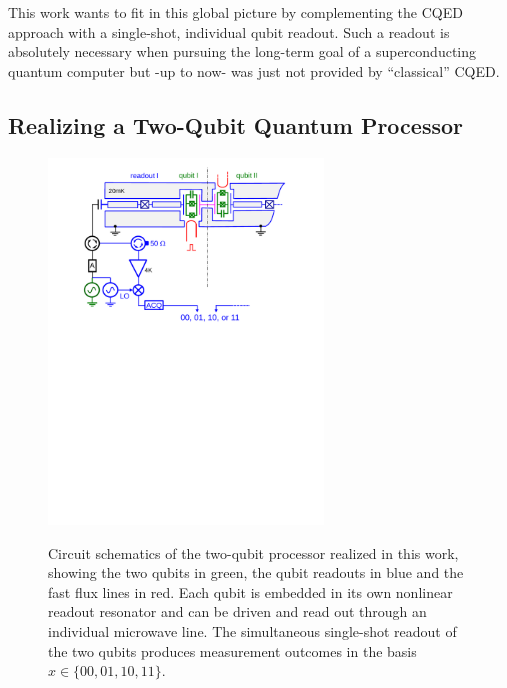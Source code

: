 This work wants to fit in this global picture by complementing the CQED approach with a single-shot, individual qubit readout. Such a readout is absolutely necessary when pursuing the long-term goal of a superconducting quantum computer but -up to now- was just not provided by ``classical'' CQED.

\subsection{Realizing a Two-Qubit Quantum Processor}

\begin{figure}[htp]
	\centering
		\includegraphics[width=0.65\textwidth]{./material/papers/grover/figures/2_qubit_processor_schematic}
	\label{fig:two_qubit_processor_schematic}
	\caption{Circuit schematics of the two-qubit processor realized in this work, showing the two qubits in green, the qubit readouts in blue and the fast flux lines in red. Each qubit is embedded in its own nonlinear readout resonator and can be driven and read out through an individual microwave line. The simultaneous single-shot readout of the two qubits produces measurement outcomes in the basis $x \in \{00,01,10,11\}$.}
\end{figure}

